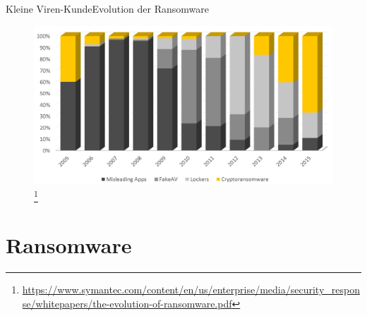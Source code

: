 \documentclass[notes,10pt]{beamer}
\begin{document}
\begin{frame}{Kleine Viren-Kunde}{Evolution der Ransomware}
	\begin{figure}[p]
		\centering
		\includegraphics[scale=0.28]{ransom-evolution.png}
		\let\thefootnote\relax\footnote{\url{https://www.symantec.com/content/en/us/enterprise/media/security\_response/whitepapers/the-evolution-of-ransomware.pdf}}
	\end{figure}
\end{frame}


\section{Ransomware}
\end{document}
